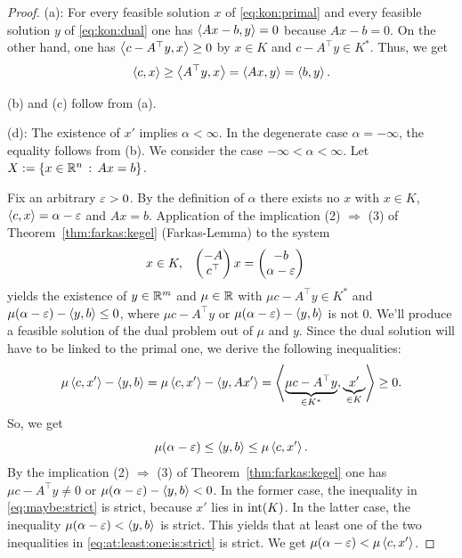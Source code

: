 \begin{proof}	
	(a): For every feasible solution $x$ of \eqref{eq:kon:primal} and every feasible solution $y$ of \eqref{eq:kon:dual} one has $\left\langle A x -b  , y \right\rangle = 0$ because $A x -b  = 0 $. On the other hand, one has $\left\langle c - A^\top y , x \right\rangle \ge 0$  by $x\in K$ and $c - A^\top y  \in K^\ast$. Thus, we get
	\[
		\left\langle c , x \right\rangle \ge \left\langle A^\top y , x \right\rangle = \left\langle A x  , y \right\rangle = \left\langle b , y \right\rangle.
	\]
	
	(b) and (c) follow from (a).
	
	(d):  The existence of $x'$ implies $\alpha < \infty$. In the degenerate case $\alpha = -\infty$, the equality follows from (b). We consider the case $-\infty < \alpha < \infty$. Let $X := \left\{ x \in \mathbb{R}^n \,:\, A x = b \right\}$.
	
	
	Fix an arbitrary ${\operatorname{\varepsilon}}> 0$. By the definition of $\alpha$ there exists no $x$ with $x \in K$, $\left\langle c , x \right\rangle = \alpha - {\operatorname{\varepsilon}}$ and $A x  = b$. Application of the implication (2) $\Rightarrow$ (3) of  Theorem~\ref{thm:farkas:kegel} (Farkas-Lemma) to the system
	\begin{align*}
		x & \in K,
		&
		\begin{pmatrix}
			-A 
			\\ 
			c^\top
		\end{pmatrix}
			x
		& = \begin{pmatrix}
			-b
			\\
			\alpha - {\operatorname{\varepsilon}}
		\end{pmatrix}
	\end{align*}
	yields the existence of $y \in \mathbb{R}^m$ and $\mu \in \mathbb{R}$ with $\mu c - A^\top y \in K^\ast$ and $\mu( \alpha - {\operatorname{\varepsilon}}) - \left\langle y , b \right\rangle \le 0$, where $\mu c - A^\top y$ or $\mu(\alpha - {\operatorname{\varepsilon}}) - \left\langle y , b \right\rangle$ is not $0$. We'll produce a feasible solution of the dual problem out of  $\mu$ and $y$. Since the dual solution will have to be linked to the primal one, we derive the following inequalities:
	\begin{equation}
		\label{eq:maybe:strict}
		\mu \left\langle c , x' \right\rangle - \left\langle y , b \right\rangle = \mu \left\langle c , x' \right\rangle - \left\langle y , A x' \right\rangle = \left\langle \underbrace{\mu c - A^\top y}_{\in K^\ast} , \underbrace{x'}_{\in K} \right\rangle \ge 0.
	\end{equation}
	So, we get
	\begin{equation}
		\label{eq:at:least:one:is:strict}
		\mu(\alpha - {\operatorname{\varepsilon}}) \le \left\langle y , b \right\rangle \le \mu \left\langle c , x' \right\rangle .
	\end{equation}
	By the implication (2) $\Rightarrow$ (3) of Theorem~\ref{thm:farkas:kegel} one has $\mu c - A^\top y \ne 0$ or $\mu ( \alpha - {\operatorname{\varepsilon}}) - \left\langle y , b \right\rangle < 0$. In the former case, the inequality in \eqref{eq:maybe:strict} is strict, because $x'$ lies in $\operatorname{int}(K)$. In the latter case, the inequality $\mu (\alpha - {\operatorname{\varepsilon}}) < \left\langle y , b \right\rangle$ is strict. This yields that at least one of the two inequalities in \eqref{eq:at:least:one:is:strict} is strict. We get $\mu (\alpha - {\operatorname{\varepsilon}}) < \mu \left\langle c , x' \right\rangle$. 


\end{proof}
